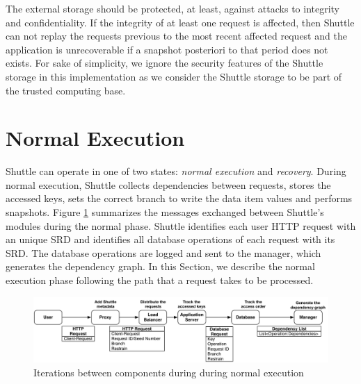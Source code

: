 The external storage should be protected, at least, against attacks to integrity and confidentiality. If the integrity of at least one request is affected, then Shuttle can not replay the requests previous to the most recent affected request and the application is unrecoverable if a snapshot posteriori to that period does not exists. For sake of simplicity, we ignore the security features of the Shuttle storage in this implementation as we consider the Shuttle storage to be part of the trusted computing base.




\section{Normal Execution}\label{sec:impl:normal}



Shuttle can operate in one of two states: \textit{normal execution} and \textit{recovery}. During normal execution, Shuttle collects  dependencies between requests, stores the accessed keys, sets the correct branch to write the data item values and performs snapshots. Figure \ref{fig:normal:mensaging} summarizes the messages exchanged between Shuttle's modules during the normal phase. Shuttle identifies each user \ac{HTTP} request with an unique \acf{SRD} and identifies all database operations of each request with its \ac{SRD}. The database operations are logged and sent to the manager, which generates the dependency graph. 
In this Section, we describe the normal execution phase following the path that a request takes to be processed.

\begin{figure}
  \centering
  \includegraphics[width=\textwidth]{images/message_normal}
  \caption{Iterations between components during during normal execution}
  \label{fig:normal:mensaging}
\end{figure}



